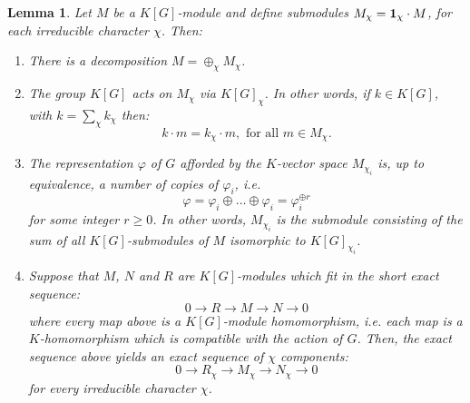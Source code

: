 \documentclass[12pt]{article}
\newtheorem*{lemma}{Lemma}
\theoremstyle{definition}
\begin{document}
\begin{lemma}
Let $M$ be a $K[G]$-module and define submodules $M_\chi={\bf 1}_{\chi}\cdot M$, for each irreducible character $\chi$. Then:
\begin{enumerate}
\item There is a decomposition $M=\oplus_\chi M_\chi$. 

\item The group $K[G]$ acts on $M_\chi$ via $K[G]_\chi$. In other words, if $k\in K[G]$, with $k=\sum_\chi k_\chi$ then:
$$k\cdot m = k_\chi \cdot m, \text{ for all } m\in M_\chi.$$

\item The representation $\varphi$ of $G$ afforded by the $K$-vector space $M_{\chi_i}$ is, up to equivalence, a number of copies of $\varphi_i$, i.e. 
$$\varphi=\varphi_i\oplus \ldots \oplus \varphi_i=\varphi_i^{\oplus r}$$
for some integer $r\geq 0$. In other words, $M_{\chi_i}$ is the submodule consisting of the sum of all $K[G]$-submodules of $M$ isomorphic to $K[G]_{\chi_i}$.

\item Suppose that $M$, $N$ and $R$ are $K[G]$-modules which fit in the short exact sequence:
$$0\longrightarrow R \longrightarrow M \longrightarrow N \longrightarrow 0$$
where every map above is a $K[G]$-module homomorphism, i.e. each map is a $K$-homomorphism which is compatible with the action of $G$. Then, the exact sequence above yields an exact sequence of $\chi$ components:
$$0\longrightarrow R_\chi \longrightarrow M_\chi \longrightarrow N_\chi \longrightarrow 0$$
for every irreducible character $\chi$.
\end{enumerate}
\end{lemma}
\end{document}

